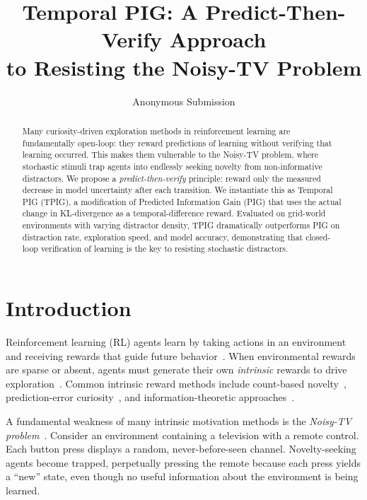 \documentclass[letterpaper]{article} %
\title{Temporal PIG: A Predict-Then-Verify Approach\\to Resisting the Noisy-TV Problem}
\author{
    Anonymous Submission
}
\begin{document}
\maketitle

\begin{abstract}
Many curiosity-driven exploration methods in reinforcement learning
are fundamentally open-loop: they reward predictions of learning
without verifying that learning occurred.  This makes them vulnerable
to the Noisy-TV problem, where stochastic stimuli trap agents into
endlessly seeking novelty from non-informative distractors.  We
propose a \emph{predict-then-verify} principle: reward only the
measured decrease in model uncertainty after each transition.  We
instantiate this as Temporal PIG (TPIG), a modification of Predicted
Information Gain (PIG) that uses the actual change in KL-divergence
as a temporal-difference reward.  Evaluated on grid-world environments
with varying distractor density, TPIG dramatically outperforms PIG
on distraction rate, exploration speed, and model accuracy,
demonstrating that closed-loop verification of learning is the key to
resisting stochastic distractors.
\end{abstract}

\section{Introduction}

Reinforcement learning (RL) agents learn by taking actions in an
environment and receiving rewards that guide future
behavior~\cite{Sutton1998,Kaelbling1996RLsurvey}.  When environmental
rewards are sparse or absent, agents must generate their own
\emph{intrinsic} rewards to drive
exploration~\cite{DBLP:journals/corr/abs-1908-06976,FToCFaIM:Jurgen,Oudeyer2007intrinsic}.
Common intrinsic reward methods include count-based
novelty~\cite{DBLP:journals/corr/TangHFSCDSTA16,Bellemare2016counting},
prediction-error
curiosity~\cite{Pathak2017ICM,Rein:VIME}, and information-theoretic
approaches~\cite{10.3389/fncir.2013.00037}.

A fundamental weakness of many intrinsic motivation methods is the
\emph{Noisy-TV problem}~\cite{Burda2019curiosity}.
Consider an environment containing a television with a remote control.
Each button press displays a random, never-before-seen channel.
Novelty-seeking agents become trapped, perpetually pressing the remote
because each press yields a ``new'' state, even though no useful
information about the environment is being learned.
\end{document}
